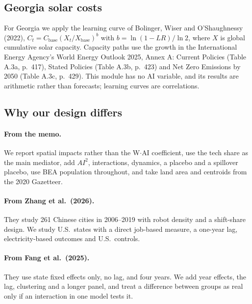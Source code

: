 \subsection{Georgia solar costs}
For Georgia we apply the learning curve of Bolinger, Wiser and O'Shaughnessy (2022), $C_t = C_{\mathrm{base}} (X_t / X_{\mathrm{base}})^{b}$ with $b = \ln(1 - LR) / \ln 2$, where $X$ is global cumulative solar capacity. Capacity paths use the growth in the International Energy Agency's World Energy Outlook 2025, Annex A: Current Policies (Table A.3a, p.\ 417), Stated Policies (Table A.3b, p.\ 423) and Net Zero Emissions by 2050 (Table A.3c, p.\ 429). This module has no AI variable, and its results are arithmetic rather than forecasts; learning curves are correlations.

\subsection{Why our design differs}
\paragraph{From the memo.} We report spatial impacts rather than the W$\cdot$AI coefficient, use the tech share as the main mediator, add $AI^2$, interactions, dynamics, a placebo and a spillover placebo, use BEA population throughout, and take land area and centroids from the 2020 Gazetteer.

\paragraph{From Zhang et al.\ (2026).} They study 261 Chinese cities in 2006--2019 with robot density and a shift-share design. We study U.S.\ states with a direct job-based measure, a one-year lag, electricity-based outcomes and U.S.\ controls.

\paragraph{From Fang et al.\ (2025).} They use state fixed effects only, no lag, and four years. We add year effects, the lag, clustering and a longer panel, and treat a difference between groups as real only if an interaction in one model tests it.
